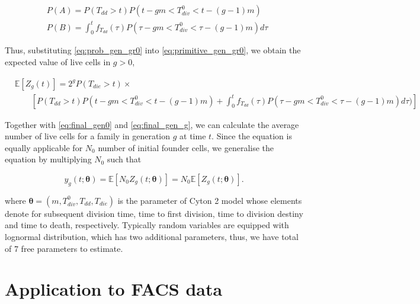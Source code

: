 \documentclass[11pt, a4paper]{article}
\begin{document}
\begin{linenomath*}
    \begin{equation}
     \label{eq:prob_gen_gr0}
    \begin{aligned}
        & P(A) = P(T_{dd} > t) P(t - gm < T_{div}^0 < t - (g-1)m) \\
        & P(B) = \int_0^t f_{T_{dd}} (\tau) P(\tau - gm < T_{div}^0 < \tau - (g-1)m) d\tau
    \end{aligned}
    \end{equation}
\end{linenomath*}
Thus, substituting \cref{eq:prob_gen_gr0} into \cref{eq:primitive_gen_gr0}, we obtain the expected value of live cells in $g > 0$,
\begin{linenomath*}
    \begin{align}
        \label{eq:final_gen_g}
        & \mathbb{E}[Z_g(t)] = 2^g P(T_{die} > t) \times \nonumber \\
        & \qquad \left[P(T_{dd} > t) P(t - gm < T_{div}^0 < t - (g - 1)m) + \int_0^t f_{T_{dd}}(\tau) P(\tau - gm < T_{div}^0 < \tau - (g - 1)m) d\tau) \right]
    \end{align}
\end{linenomath*}
Together with \cref{eq:final_gen0} and \cref{eq:final_gen_g}, we can calculate the average number of live cells for a family in generation $g$ at time $t$. Since the equation is equally applicable for $N_0$ number of initial founder cells, we generalise the equation by multiplying $N_0$ such that
\begin{linenomath*}
    \begin{equation}
        \label{eq:final_expected_cell_number}
        y_g(t; \boldsymbol{\theta}) = \mathbb{E}[N_0 Z_g(t;\boldsymbol{\theta})] = N_0 \mathbb{E}[Z_g(t;\boldsymbol{\theta})].
    \end{equation}
\end{linenomath*}
where $\boldsymbol{\theta} = (m, T_{div}^0, T_{dd}, T_{die})$ is the parameter of Cyton 2 model whose elements denote for subsequent division time, time to first division, time to division destiny and time to death, respectively. Typically random variables are equipped with lognormal distribution, which has two additional parameters, thus, we have total of 7 free parameters to estimate.

\nolinenumbers
\section{Application to FACS data}
\end{document}

